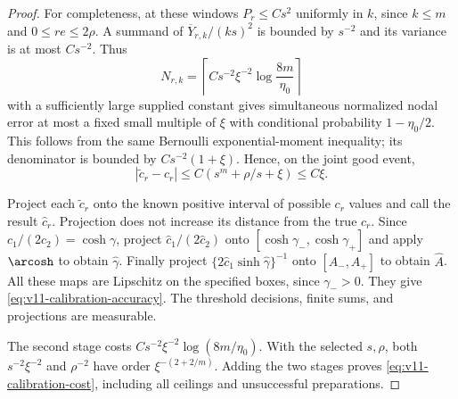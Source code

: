 \begin{proof}
For completeness, at these windows $P_r\le Cs^2$ uniformly in
$k$, since $k\le m$ and $0\le re\le2\rho$. A summand of
$\overline Y_{r,k}/(ks)^2$ is bounded by $s^{-2}$ and its
variance is at most $Cs^{-2}$. Thus
\[
 N_{r,k}=\left\lceil C s^{-2}\xi^{-2}
                                  \log\frac{8m}{\eta_0}\right\rceil
\]
with a sufficiently large supplied constant gives simultaneous
normalized nodal error at most a fixed small multiple of $\xi$
with conditional probability $1-\eta_0/2$. This follows from the
same Bernoulli exponential-moment inequality; its denominator is
bounded by $C s^{-2}(1+\xi)$. Hence, on the joint good event,
\[
 |\widetilde c_r-c_r|
                 \le C(s^m+\rho/s+\xi)\le C\xi.
\]

Project each $\widetilde c_r$ onto the known positive interval of
possible $c_r$ values and call the result $\widehat c_r$. Projection
does not increase its distance from the true $c_r$. Since
$c_1/(2c_2)=\cosh\gamma$, project
$\widehat c_1/(2\widehat c_2)$ onto
$[\cosh\gamma_-,\cosh\gamma_+]$ and apply $\arcosh$ to obtain
$\widehat\gamma$. Finally project
$\{2\widehat c_1\sinh\widehat\gamma\}^{-1}$ onto
$[A_-,A_+]$ to obtain $\widehat A$. All these maps are Lipschitz
on the specified boxes, since $\gamma_->0$. They give
\eqref{eq:v11-calibration-accuracy}. The threshold decisions, finite
sums, and projections are measurable.

The second stage costs $C s^{-2}\xi^{-2}\log(8m/\eta_0)$.
With the selected $s,\rho$, both $s^{-2}\xi^{-2}$ and
$\rho^{-2}$ have order $\xi^{-(2+2/m)}$. Adding the two stages
proves \eqref{eq:v11-calibration-cost}, including all ceilings and
unsuccessful preparations.
\end{proof}

